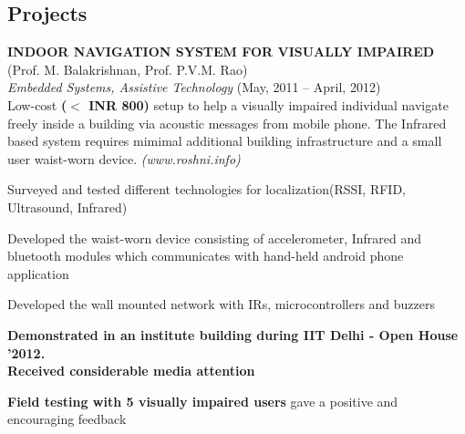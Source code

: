 \documentclass[margin,line]{resume}
\begin{document}
\begin{resume}
    \section{\mysidestyle Projects}

    \textbf{INDOOR NAVIGATION SYSTEM FOR VISUALLY IMPAIRED}			\vspace{1mm}\\\vspace{1mm}%
    (Prof. M. Balakrishnan, Prof. P.V.M. Rao)					\\\vspace{1mm}%
    \textsl{Embedded Systems, Assistive Technology}          		        \hfill(May, 2011 -- April, 2012) \\
    Low-cost \textbf{($<$ INR 800)} setup to help a visually impaired individual navigate freely inside a building via acoustic messages from mobile phone. The Infrared based system requires mimimal additional building infrastructure and a small user waist-worn device.    \hfill \textsl{(www.roshni.info)}
    \begin{list2}
     \item Surveyed and tested different technologies for localization(RSSI, RFID, Ultrasound, Infrared) 
     \item Developed the waist-worn device consisting of accelerometer, Infrared and bluetooth modules which communicates with hand-held android phone application 
     \item Developed the wall mounted network with IRs, microcontrollers and buzzers
     \item \textbf{Demonstrated in an institute building during IIT Delhi - Open House '2012.\\ Received considerable media attention}
     \item \textbf{Field testing with 5 visually impaired users} gave a positive and encouraging feedback 
    \end{list2}
			      \vspace{1mm}


\end{resume}
\end{document}
